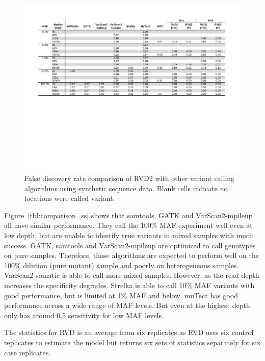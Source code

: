 \documentclass{bioinfo}
\begin{document}
\begin{figure}[!tbhp]
\begin{center}
\includegraphics[width=1\textwidth]{pdf_figs/comparison_table_fdr.pdf}
\caption{False discovery rate comparison of RVD2 with other variant calling algorithms using synthetic sequence data. Blank cells indicate no locations were called variant.}
\label{tbl:comparison_fdr}
\end{center}
\end{figure}
Figure~\ref{tbl:comparison_ss} shows that samtools, GATK and VarScan2-mpileup all have similar performance. They call the 100\% MAF experiment well even at low depth, but are unable to identify true variants in mixed samples with much success. GATK, samtools and VarScan2-mpileup are optimized to call genotypes on pure samples. Therefore, those algorithms are expected to perform well on the 100\% dilution (pure mutant) sample and poorly on heterogeneous samples. VarScan2-somatic is able to call more mixed samples. However, as the read depth increases the specificity degrades. Strelka is able to call 10\% MAF variants with good performance, but is limited at 1\% MAF and below. muTect has good performance across a wide range of MAF levels. But even at the highest depth only has around 0.5 sensitivity for low MAF levels.

The statistics for RVD is an average from six replicates as RVD uses six control replicates to estimate the model but returns six sets of statistics separately for six case replicates.
\end{document}
